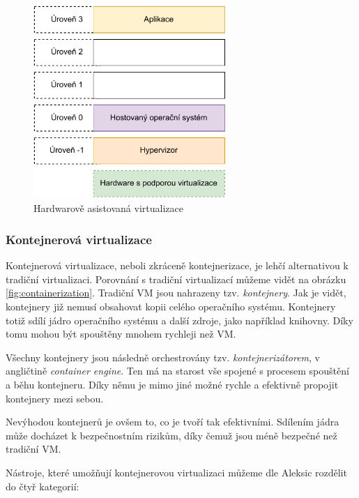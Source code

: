 \begin{figure}[htbp]
    \centering 
    \includegraphics[width=0.65\textwidth]{assets/img/hardware-asssist-virt.pdf}
    \caption{Hardwarově asistovaná virtualizace}
    \label{fig:hardware_asssist_virt}
\end{figure}

\subsubsection{Kontejnerová virtualizace}

Kontejnerová virtualizace, neboli zkráceně kontejnerizace, je lehčí alternativou k tradiční virtualizaci. Porovnání s tradiční virtualizací můžeme vidět na obrázku \ref{fig:containerization}. Tradiční VM jsou nahrazeny tzv. \textit{kontejnery}. Jak je vidět, kontejnery již nemusí obsahovat kopii celého operačního systému. Kontejnery totiž sdílí jádro operačního systému a další zdroje, jako například knihovny. Díky tomu mohou být spouštěny mnohem rychleji než VM. \cite{8693491}

Všechny kontejnery jsou následně orchestrovány tzv. \textit{kontejnerizátorem}, v angličtině \textit{container engine}. Ten má na starost vše spojené s procesem spouštění a běhu kontejneru. Díky němu je mimo jiné možné rychle a efektivně propojit kontejnery mezi sebou.\cite{Bentaleb2021} 

Nevýhodou kontejnerů je ovšem to, co je tvoří tak efektivními. Sdílením jádra může docházet k bezpečnostním rizikům, díky čemuž jsou méně bezpečné než tradiční VM.\cite{6498558}

Nástroje, které umožňují kontejnerovou virtualizaci můžeme dle Aleksic\cite{docker_alt_23} rozdělit do čtyř kategorií:

